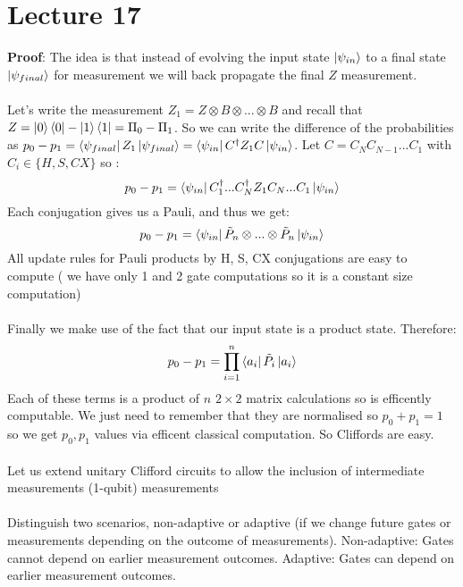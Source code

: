\documentclass{article}
\begin{document}
               \section{Lecture 17}
               \textbf{Proof}: The idea is that instead of evolving the input state $\ket{\psi_{in}}$ to a final state $\ket{\psi_{final}}$ for measurement we will back propagate the final $Z$ measurement. \\\\
               Let's write the measurement $Z_1 = Z \otimes B \otimes ... \otimes B$ and recall that $Z = \ket{0} \bra{0} - \ket{1} \bra{1} = \Pi_0 - \Pi_1$. So we can write the difference of the probabilities as $p_0 - p_1 = \bra{\psi_{final}} Z_1 \ket{\psi_{final}} = \bra{\psi_{in}} C^{\dagger} Z_1 C \ket{\psi_{in}}$. Let $C = C_NC_{N-1} ... C_1$ with $C_i \in \{ H, S, CX\}$ so :
               $$
               p_0 - p_1 = \bra{\psi_{in}} C_1^{\dagger} ... C_{N}^{\dagger} Z_1 C_N ... C_1 \ket{\psi_{in}}
               $$
               Each conjugation gives us a Pauli, and thus we get:
               $$
               p_0 - p_1 = \bra{\psi_{in}} \tilde P_n \otimes ... \otimes \tilde P_n \ket{\psi_{in}}
               $$
               All update rules for Pauli products by H, S, CX conjugations are easy to compute ( we have only 1 and 2 gate computations so it is a constant size computation)\\\\
               Finally we make use of the fact that our input state is a product state. Therefore:
               $$
                p_0 - p_1 = \prod_{i=1}^n \bra{a_i} \tilde P_i \ket{a_i}
               $$
               Each of these terms is a product of $n$ $2\times2$ matrix calculations so is efficently computable. We just need to remember that they are normalised so $p_0 + p_1 =1$ so we get $p_0, p_1$ values via efficent classical computation. So Cliffords are easy.\\\\
               Let us extend unitary Clifford circuits to allow the inclusion of intermediate measurements (1-qubit) measurements\\\\
               Distinguish two scenarios, non-adaptive or adaptive (if we change future gates or measurements depending on the outcome of measurements). Non-adaptive: Gates cannot depend on earlier measurement outcomes. Adaptive: Gates can depend on earlier measurement outcomes.\\\\
\end{document}
